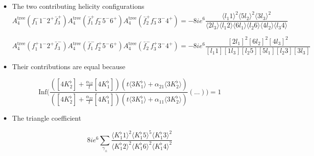\documentclass[english]{beamer}
\newcommand{\Inf}{\mathrm{Inf}}
\begin{document}
\begin{frame}[shrink=20]
\begin{itemize}
\item The two contributing helicity configurations
\small
\begin{equation*}
A_{4}^{\mathrm{tree}}(f_1^- 1^-2^+\bar{f}_3^+)
A_4^{\mathrm{tree}}(\bar{f}_1^+f_2^-5^-6^+)
A_4^{\mathrm{tree}}(\bar{f}_2^+ f_3^-3^-4^+)
=
-8ie^6\frac{\langle l_1 1\rangle^2 \langle 5l_2 \rangle^2\langle 3l_3\rangle^2}{\langle2 l_3\rangle\langle l_1 2\rangle\langle 6 l_1 \rangle\langle l_2 6\rangle\langle 4 l_2\rangle\langle l_3 4\rangle}
\end{equation*}


\begin{equation*}
A_{4}^{\mathrm{tree}}(f_1^+ 1^-2^+\bar{f}_3^-)
A_4^{\mathrm{tree}}(\bar{f}_1^-f_2^+5^-6^+)
A_4^{\mathrm{tree}}(\bar{f}_2^- f_3^+3^-4^+)
=
-8ie^6\frac{[2l_1]^2[6l_2]^2[4l_3]^2}{[l_1 1 ][1l_3][l_2 5][5l_1][l_2 3][3l_3]}
\end{equation*}

\normalsize

\item Their contributions are equal because


\begin{equation*}
\Inf\Big(\frac{([4K_2^\flat] + \frac{\alpha_{12}}{t}[4K_1^\flat])(t\langle 3K_1^\flat \rangle + \alpha_{21}\langle 3K_2^\flat\rangle)}{([4K_2^\flat] + \frac{\alpha_{22}}{t}[4K_1^\flat])(t\langle 3K_1^\flat \rangle + \alpha_{11}\langle 3K_2^\flat\rangle)}(\ldots)\Big)
= 1
\end{equation*} 

\item The triangle coefficient

\begin{equation*}
8ie^6\sum_{\gamma_\pm}\frac{\langle K_1^\flat 1 \rangle^2\langle K_1^\flat 5\rangle^5 \langle K_1^\flat 3 \rangle^2}{\langle K_1^\flat 2 \rangle^2\langle K_1^\flat 6\rangle^2 \langle K_1^\flat 4 \rangle^2}
\end{equation*}

\end{itemize}
\end{frame}
\end{document}
